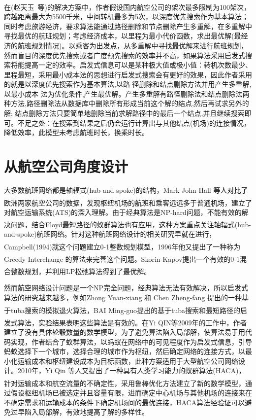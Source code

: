 \documentclass[runningheads]{llncs}
\newcommand{\upcite}[1]{\textsuperscript{\textsuperscript{\cite{#1}}}}
\begin{document}
在(赵天玉\ 等)\upcite{ref_article2}的解决方案中，作者假设国内航空公司的架次最多限制为100架次，跨越距离最大为5500千米，中间转机最多为5次，以深度优先搜索作为基本算法；同时考虑旅游经济，要求算法能通过路径删除和节点删除产生多重解，在多重解中寻找最优的航班规划；考虑经济成本，以里程为最小代价函数，求出最优解(最经济的航班规划情况)。以乘客为出发点，从多重解中寻找最优解来进行航班规划，然而盲目的深度优先搜索或者广度预先搜索的效率并不高，如果算法采用启发式搜索将能提高一定的效率。启发式信息可以是某种极大值或极小值：转机次数最少、里程最短，采用最小成本法的思想进行启发式搜索会有更好的效果，因此作者采用的就是以深度优先搜索作为基本算法,以路 径删除和结点删除方法并用产生多重解,以最小成本 法为优化条件,产生最优解。产生多重解有路径删除法和结点删除法两种方法,路径删除法从数据库中删除所有形成当前这个解的结点,然后再试求另外的解; 结点删除方法只要简单地删除当前求解路径中的最后一个结点,并且继续搜索即可。不足之处：在搜索到结果之后仍会运行计算出与其他结点(机场)的连接情况，降低效率，此模型未考虑航班时长，换乘时长。

\section{从航空公司角度设计}
大多数航班网络都是轴辐式(hub-and-spoke)的结构，Mark John Hall 等人对比了欧洲两家航空公司的数据\upcite{ref_article15}，发现枢纽机场的航班和乘客远远多于普通机场，建立了对航空运输系统(ATS)的深入理解。由于经典算法是NP-hard问题，不能有效的解决问题，结合Floyd最短路径的蚁群算法\upcite{ref_article10}也有应用，这种方案重点关注轴辐式(hub-and-spoke)航班网络。针对这种航班网络设计的相关研究早就在进行，Campbell(1994)就这个问题建立0-1整数规划模型\upcite{ref_article20}，1996年他又提出了一种称为Greedy Interchange 的算法来完善这个问题\upcite{ref_article21}。Skorin-Kapov提出一个有效的0-1混合整数规划\upcite{ref_article22}，并利用LP松弛算法得到了最优解。

然而航空网络设计问题是一个NP完全问题，经典算法无法有效解决，所以启发式算法的研究越来越多，例如Zhong Yuan-xiang 和 Chen Zheng-fang 提出的一种基于tuba搜索的模拟退火算法\upcite{ref_article23}，BAI Ming-guo提出的基于tuba搜索和最短路径的启发式算法\upcite{ref_article24}，实验结果表明这些算法是有效的。在Yi QIN等2009年的工作中\upcite{ref_article10}，作者建立了没有具体轮毂数量的数学模型，为了避免算法陷入局部解，使算法易于用代码实现，作者结合了蚁群算法，以蚂蚁在网络中的可见程度作为启发式信息，引导蚂蚁选择下一个城市，选择合理的城市作为枢纽，然后确定网络的连接方式，以最小化运输成本和枢纽建设成本为目标函数，此种方案适用于大型航空公司网络设计。2010年，Yi Qin 等人又提出了一种具有人类学习能力的蚁群算法(HACA)，针对运输成本和航空流量的不确定性，采用鲁棒优化方法建立了新的数学模型\upcite{ref_article16}，通过假设枢纽机场已被选定并且容量有限，进而确定中心机场与其他机场的连接来在不确定需求和运输成本的条件下确定机场间的最优连接，HACA算法经验证可以避免过早陷入局部解，有效地提高了解的多样性。
\end{document}

